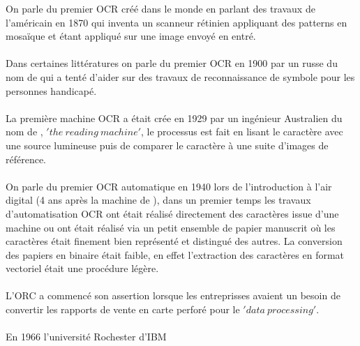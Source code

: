 
On parle du premier OCR créé dans le monde en parlant des travaux de l'américain  en 1870 qui inventa un scanneur rétinien appliquant des patterns en mosaïque et étant appliqué sur une image envoyé en entré.\\
\\
Dans certaines littératures on parle du premier OCR en 1900 par un russe du nom de  qui a tenté d'aider sur des travaux de reconnaissance de symbole pour les personnes handicapé.\\
\\
La première machine OCR a était crée en 1929 par un ingénieur Australien du nom de , $'the\ reading\ machine'$, le processus est fait en lisant le caractère avec une source lumineuse puis de comparer le caractère à une suite d'images de référence.\\
\\
On parle du premier OCR automatique en 1940 lors de l'introduction à l'air digital (4 ans après la machine de ), dans un premier temps  les travaux d'automatisation OCR ont était réalisé directement des caractères issue d'une machine ou ont était réalisé via un petit ensemble de papier manuscrit où les caractères était finement bien représenté et distingué des autres. La conversion des papiers en binaire était faible, en effet l'extraction des caractères en format vectoriel était une procédure légère.\\
\\
L'ORC a commencé son assertion lorsque les entreprisses avaient un besoin de convertir les rapports de vente en carte perforé pour le $'data\ processing'$.\\
\\
En 1966 l'université Rochester d'IBM 

\pagebreak